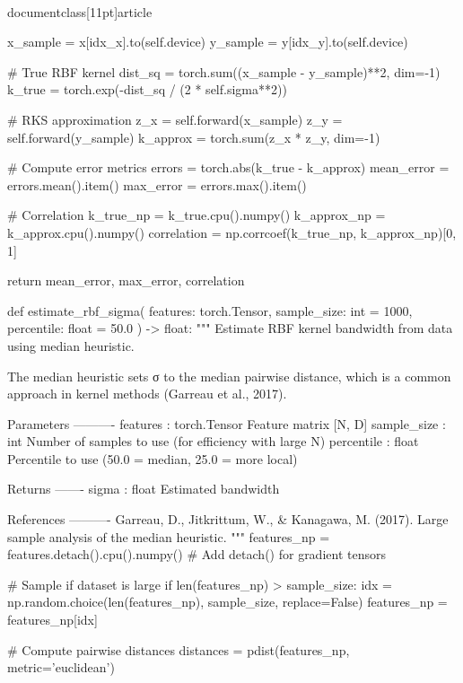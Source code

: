 \\documentclass[11pt]{article}
\begin{document}
\begin{CodeBlock}
            x_sample = x[idx_x].to(self.device)
            y_sample = y[idx_y].to(self.device)
            
            # True RBF kernel
            dist_sq = torch.sum((x_sample - y_sample)**2, dim=-1)
            k_true = torch.exp(-dist_sq / (2 * self.sigma**2))
            
            # RKS approximation
            z_x = self.forward(x_sample)
            z_y = self.forward(y_sample)
            k_approx = torch.sum(z_x * z_y, dim=-1)
            
            # Compute error metrics
            errors = torch.abs(k_true - k_approx)
            mean_error = errors.mean().item()
            max_error = errors.max().item()
            
            # Correlation
            k_true_np = k_true.cpu().numpy()
            k_approx_np = k_approx.cpu().numpy()
            correlation = np.corrcoef(k_true_np, k_approx_np)[0, 1]
            
            return mean_error, max_error, correlation


def estimate_rbf_sigma(
    features: torch.Tensor,
    sample_size: int = 1000,
    percentile: float = 50.0
) -> float:
    """
    Estimate RBF kernel bandwidth from data using median heuristic.
    
    The median heuristic sets σ to the median pairwise distance,
    which is a common approach in kernel methods (Garreau et al., 2017).
    
    Parameters
    ----------
    features : torch.Tensor
        Feature matrix [N, D]
    sample_size : int
        Number of samples to use (for efficiency with large N)
    percentile : float
        Percentile to use (50.0 = median, 25.0 = more local)
    
    Returns
    -------
    sigma : float
        Estimated bandwidth
    
    References
    ----------
    Garreau, D., Jitkrittum, W., & Kanagawa, M. (2017).
    Large sample analysis of the median heuristic.
    """
    features_np = features.detach().cpu().numpy()  # Add detach() for gradient tensors
    
    # Sample if dataset is large
    if len(features_np) > sample_size:
        idx = np.random.choice(len(features_np), sample_size, replace=False)
        features_np = features_np[idx]
    
    # Compute pairwise distances
    distances = pdist(features_np, metric='euclidean')
    

\end{CodeBlock}
\end{document}
